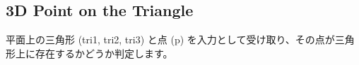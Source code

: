 \subsection{3D Point on the Triangle}

平面上の三角形 (tri1, tri2, tri3) と点 (p) を入力として受け取り、その点が三角形上に存在するかどうか判定します。



